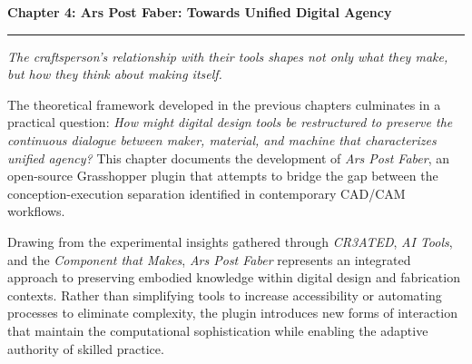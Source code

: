 \clearpage


\setcounter{chapter}{4}
\setcounter{section}{0}


\pagestyle{fancy}
\fancyhf{} %
\fancyfoot[C]{\thepage} %
\renewcommand{\headrulewidth}{0pt}
\renewcommand{\footrulewidth}{0pt}

\noindent
{\Large\textbf{Chapter 4: Ars Post Faber: Towards Unified Digital Agency}}
\vspace{0.3cm}
\hrule
\vspace{0.8cm}
\label{ch:ArsPostFaber}

\setlength{\parindent}{0pt}

\textit{The craftsperson's relationship with their tools shapes not only what they make, but how they think about making itself.}

\vspace{0.5cm}

The theoretical framework developed in the previous chapters culminates in a practical question: \textit{How might digital design tools be restructured to preserve the continuous dialogue between maker, material, and machine that characterizes unified agency?} This chapter documents the development of \textit{Ars Post Faber}, an open-source Grasshopper plugin that attempts to bridge the gap between the conception-execution separation identified in contemporary CAD/CAM workflows.

\vspace{0.5cm}

Drawing from the experimental insights gathered through \textit{CR3ATED}, \textit{AI Tools}, and the \textit{Component that Makes}, \textit{Ars Post Faber} represents an integrated approach to preserving embodied knowledge within digital design and fabrication contexts. Rather than simplifying tools to increase accessibility or automating processes to eliminate complexity, the plugin introduces new forms of interaction that maintain the computational sophistication while enabling the adaptive authority of skilled practice.

